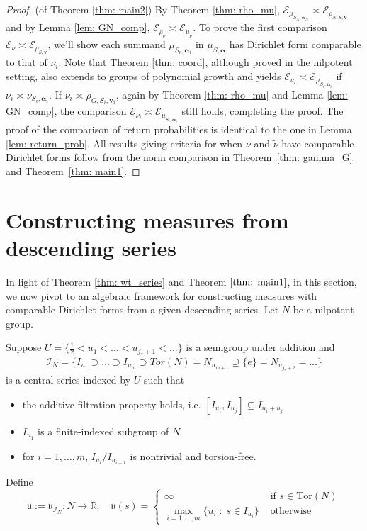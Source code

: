 \documentclass[pdflatex,sn-mathphys-num]{sn-jnl}%
\theoremstyle{thmstyleone}%
\theoremstyle{thmstyletwo}%
\theoremstyle{thmstylethree}%
\begin{document}
 \begin{proof} (of Theorem \ref{thm: main2})
    By Theorem \ref{thm: rho_mu}, $\mathcal{E}_{\mu_{S_N,\bm{\alpha}_N}} \asymp \mathcal{E}_{\rho_{N,S,\mathbf{v}}}$ and by Lemma \ref{lem: GN_comp}, $\mathcal{E}_{\rho_\nu} \asymp \mathcal{E}_{\mu_{\nu}}$.  To prove the first comparison $\mathcal{E}_{\nu} \asymp \mathcal{E}_{\rho_{S,\mathbf{v}}}$, we'll show each summand $\mu_{S_i, \bm{\alpha}_i}$ in $\mu_{S,\bm{\alpha}}$ has Dirichlet form comparable to that of $\nu_i$. 
     Note that Theorem \ref{thm: coord}, although proved in the nilpotent setting, also extends to groups of polynomial growth and yields
    $\mathcal{E}_{\nu_i} \asymp \mathcal{E}_{\mu_{S_i, \bm{\alpha}_i}}$ if 
    $\nu_i \asymp \nu_{S_i,\bm{\alpha}_i}$. If $\nu_i \asymp \rho_{G, S_i,\mathbf{v}_i}$, again by Theorem \ref{thm: rho_mu} and Lemma \ref{lem: GN_comp},  the comparison $\mathcal{E}_{\nu_i} \asymp \mathcal{E}_{\mu_{S_i, \bm{\alpha}_i}}$ still holds, completing the proof. 
    The proof of the comparison of return probabilities is identical to the one in Lemma \ref{lem: return_prob}. 
All results giving criteria for when  $\nu$ and $\tilde{\nu}$ have comparable Dirichlet forms follow from the norm comparison in Theorem~\ref{thm: gamma_G} and Theorem~\ref{thm: main1}.
\end{proof}



\section{Constructing measures from descending series}


In light of Theorem \ref{thm: wt_series} and Theorem $\ref{thm: main1}$, in this section, we now pivot to an algebraic framework for constructing measures with comparable Dirichlet forms from a given descending series. 
Let $N$ be a nilpotent group. 

Suppose $U = \{\frac{1}{2} < u_1 < \ldots <  u_{j_* + 1} < \ldots \}$ is a semigroup under addition and  
\begin{align}
    \label{se: wt_series_plain}
     \mathcal{I}_N = \Big\{ I_{u_1} \supset \ldots \supset I_{u_m}   \supset   
 Tor(N) =  N_{u_{m+1}}   \supseteq    \{e\} =   N_{u_{j_* + 2}} = \ldots  \Big\}
\end{align}
is a central series indexed by $U$ such that 
\begin{itemize}
    \item the additive filtration property holds, i.e. $[I_{u_i}, I_{u_j}]\subseteq I_{u_i + u_j} $
    \item $I_{u_1}$ is a finite-indexed subgroup of $N$
    \item for $i=1,\ldots, m$, $I_{u_i}/I_{u_{i+1}}$ is nontrivial and torsion-free. 
\end{itemize}
Define 
$$\mathfrak{u} := \mathfrak{u}_{\mathcal{I}_N}: 
N \to \mathbb{R}, \quad \mathfrak{u}(s) =  
\begin{cases}
\infty & \text{ if }s \in \mbox{Tor}(N)\\ 
   \max_{i=1,\ldots,m}\{u_i\;:\;s \in I_{u_i}\} &\text{ otherwise}
\end{cases}
$$ 
\end{document}
